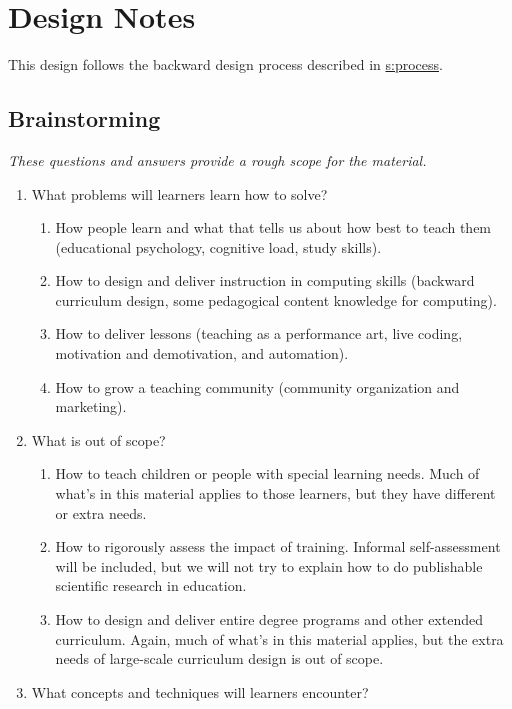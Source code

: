 \chapter{Design Notes}\label{s:v3}

This design follows the backward design process described in
\protect\hyperlink{CHAPTER}{s:process}.

\section{Brainstorming}\label{brainstorming}

\emph{These questions and answers provide a rough scope for the material.}

\begin{enumerate}
\item
  What problems will learners learn how to solve?

  \begin{enumerate}
  \item
    How people learn and what that tells us about how best to teach
    them (educational psychology, cognitive load, study skills).
  \item
    How to design and deliver instruction in computing skills
    (backward curriculum design, some pedagogical content knowledge
    for computing).
  \item
    How to deliver lessons (teaching as a performance art, live
    coding, motivation and demotivation, and automation).
  \item
    How to grow a teaching community (community organization and
    marketing).
  \end{enumerate}
\item
  What is out of scope?

  \begin{enumerate}
  \item
    How to teach children or people with special learning needs.
    Much of what's in this material applies to those learners, but
    they have different or extra needs.
  \item
    How to rigorously assess the impact of training. Informal
    self-assessment will be included, but we will not try to explain
    how to do publishable scientific research in education.
  \item
    How to design and deliver entire degree programs and other
    extended curriculum. Again, much of what's in this material
    applies, but the extra needs of large-scale curriculum design is
    out of scope.
  \end{enumerate}
\item
  What concepts and techniques will learners encounter?


\end{enumerate}
